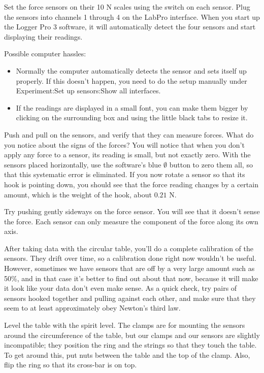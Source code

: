 Set the force sensors on their 10 N scales using the switch on each
sensor.
Plug the sensors into channels 1 through 4 on the LabPro interface.
When you start up the Logger Pro 3 software, it will automatically detect
the four sensors and start displaying their readings. 


Possible computer hassles:
\begin{itemize}
\item[] Normally the computer automatically detects the sensor and sets itself up
properly. If this doesn't happen, you need to do the setup manually under
Experiment:Set up sensors:Show all interfaces.
\item[] If the readings are displayed in a small font, you can make them bigger
by clicking on the surrounding box and using the little black tabs to resize it.
\end{itemize}

Push and pull on the sensors, and verify that they can measure forces.
What do you notice about the signs of the forces?
You will notice that when you don't apply any force to a sensor, its reading
is small, but not exactly zero.
With the sensors placed horizontally, use the software's blue $\emptyset$ button to zero them all, so that
this systematic error is eliminated. If you now rotate a sensor so that its hook
is pointing down, you should see that the force reading changes by a certain amount,
which is the weight of the hook, about $0.21$ N.

Try pushing gently sideways on the force sensor. You will see that it doesn't
sense the force.
Each sensor can only measure the component of the force along its
own axis.

After taking data with the circular table, you'll do a complete calibration of the
sensors. They drift over time, so a calibration done right now wouldn't be useful.
However, sometimes we have sensors that are off by a very large
amount such as 50\%, and in that case it's better to find out about that now, because
it will make it look like your data don't even make sense. As a quick check, try
pairs of sensors hooked together and pulling against each other, and make sure that
they seem to at least approximately obey Newton's third law.

Level the table with the spirit level. The clamps are for mounting the sensors around
the circumference of the table, but our clamps and our sensors are slightly incompatible;
they position the ring and the strings so that they touch the table. To get around this, put
nuts between the table and the top of the clamp. Also, flip the ring so that its
cross-bar is on top.

